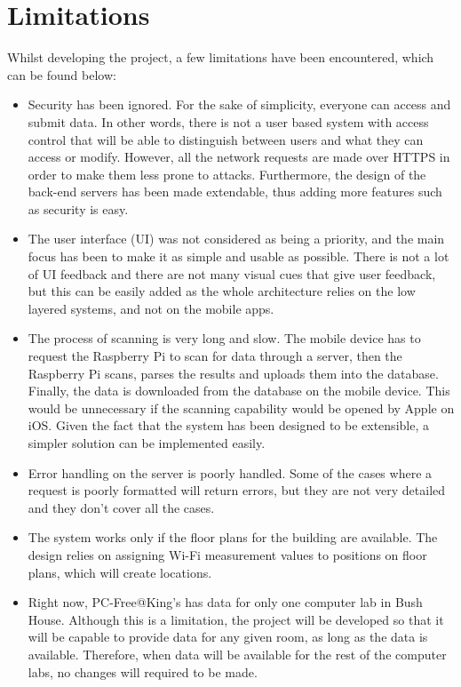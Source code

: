 \section{Limitations}
\label{sec:limitations}
Whilst developing the project, a few limitations have been encountered, which can be found below:
\begin{itemize}
    \item Security has been ignored. For the sake of simplicity, everyone can access and submit data. In other words, there is not a user based system with access control that will be able to distinguish between users and what they can access or modify. However, all the network requests are made over HTTPS in order to make them less prone to attacks. Furthermore, the design of the back-end servers has been made extendable, thus adding more features such as security is easy.

    \item The user interface (UI) was not considered as being a priority, and the main focus has been to make it as simple and usable as possible. There is not a lot of UI feedback and there are not many visual cues that give user feedback, but this can be easily added as the whole architecture relies on the low layered systems, and not on the mobile apps.
    
    \item The process of scanning is very long and slow. The mobile device has to request the Raspberry Pi to scan for data through a server, then the Raspberry Pi scans, parses the results and uploads them into the database. Finally, the data is downloaded from the database on the mobile device. This would be unnecessary if the scanning capability would be opened by Apple on iOS. Given the fact that the system has been designed to be extensible, a simpler solution can be implemented easily.

    \item Error handling on the server is poorly handled. Some of the cases where a request is poorly formatted will return errors, but they are not very detailed and they don't cover all the cases.
    
    \item The system works only if the floor plans for the building are available. The design relies on assigning Wi-Fi measurement values to positions on floor plans, which will create locations.
    
    \item Right now, PC-Free@King's has data for only one computer lab in Bush House. Although this is a limitation, the project will be developed so that it will be capable to provide data for any given room, as long as the data is available. Therefore, when data will be available for the rest of the computer labs, no changes will required to be made.
\end{itemize}